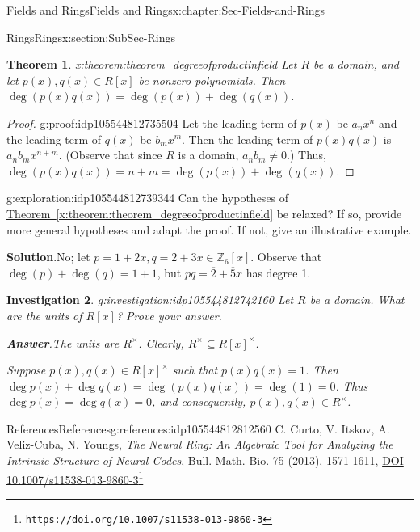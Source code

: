 \documentclass[oneside,10pt,]{book}
\newcommand{\blocktitlefont}{\relax}
\newcommand{\xreffont}{\relax}
\numberwithin{equation}{section}
\def\Z{{\mathbb Z}}
\newtheorem{theorem}{Theorem}[section]
\newtheorem{investigation}[theorem]{Investigation}
\begin{document}
\begin{chapterptx}{Fields and Rings}{}{Fields and Rings}{}{}{x:chapter:Sec-Fields-and-Rings}
\begin{sectionptx}{Rings}{}{Rings}{}{}{x:section:SubSec-Rings}
\begin{theorem}{}{}{x:theorem:theorem_degreeofproductinfield}%
Let \(R\) be a domain, and let \(p(x),q(x)\in R[x]\) be nonzero polynomials. Then \(\deg(p(x) q(x)) = \deg(p(x)) + \deg(q(x))\).%
\end{theorem}
\begin{proof}{}{g:proof:idp105544812735504}
Let the leading term of \(p(x)\) be \(a_n x^n\) and the leading term of \(q(x)\) be \(b_m x^m\). Then the leading term of \(p(x) q(x)\) is \(a_n b_m x^{n+m}\). (Observe that since \(R\) is a domain, \(a_n b_m \ne 0\).) Thus, \(\deg(p(x) q(x)) = n+m = \deg(p(x)) + \deg(q(x))\).%
\end{proof}
\begin{exploration}{}{g:exploration:idp105544812739344}%
Can the hypotheses of \hyperref[x:theorem:theorem_degreeofproductinfield]{Theorem~{\xreffont\ref{x:theorem:theorem_degreeofproductinfield}}} be relaxed? If so, provide more general hypotheses and adapt the proof. If not, give an illustrative example.%
\par\smallskip%
\noindent\textbf{\blocktitlefont Solution}.\hypertarget{g:solution:idp105544812740624}{}\quad{}No; let \(p = \overline{1} + \overline{2}x, q = \overline{2} + \overline{3}x\in \Z_6[x]\). Observe that \(\deg(p) + \deg(q) = 1 + 1\), but \(pq = \overline{2} + \overline{5}x\) has degree 1.%
\end{exploration}%
\begin{investigation}{}{g:investigation:idp105544812742160}%
Let \(R\) be a domain. What are the units of \(R[x]\)? Prove your answer.%
\par\smallskip%
\noindent\textbf{\blocktitlefont Answer}.\hypertarget{g:answer:idp105544812743696}{}\quad{}The units are \(R^\times\). Clearly, \(R^\times\subseteq R[x]^\times\).%
\par
Suppose \(p(x),q(x)\in R[x]^\times\) such that \(p(x) q(x) = 1\). Then \(\deg p(x) + \deg q(x) = \deg(p(x) q(x)) = \deg(1) = 0\). Thus \(\deg p(x) = \deg q(x) = 0\), and consequently, \(p(x),q(x)\in R^\times\).%
\end{investigation}%
%
%
\typeout{************************************************}
\typeout{************************************************}
%
\begin{references-subsection-numberless}{References}{}{References}{}{}{g:references:idp105544812812560}
C. Curto, V. Itskov, A. Veliz-Cuba, N. Youngs, \emph{The Neural Ring: An Algebraic Tool for Analyzing the Intrinsic Structure of Neural Codes}, Bull. Math. Bio. 75 (2013), 1571-1611, \href{https://doi.org/10.1007/s11538-013-9860-3}{DOI 10.1007\slash{}s11538-013-9860-3}\footnote{\nolinkurl{https://doi.org/10.1007/s11538-013-9860-3}\label{g:fn:idp105544812814224}}\end{references-subsection-numberless}

\end{sectionptx}
\end{chapterptx}
\end{document}
